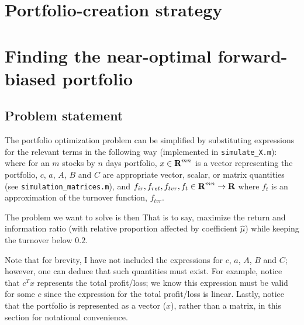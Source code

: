 \documentclass{article}
\begin{document}
 \clearpage


\section{Portfolio-creation strategy}


\section{Finding the near-optimal forward-biased portfolio}

\subsection{Problem statement}
    The portfolio optimization problem can be simplified 
        by substituting expressions for the relevant terms in the following way
        (implemented in \verb+simulate_X.m+):
    where for an $m$ stocks by $n$ days portfolio,
        \BI $x \in {\mbox{\bf R}}^{mn}$ is a vector representing the portfolio,
        \I  $c$, $a$, $A$, $B$ and $C$ are appropriate vector, scalar, 
            or matrix quantities (see \verb+simulation_matrices.m+), and
        \I  $f_{ir}, f_{ret}, f_{tvr}, f_{t} \in {\mbox{\bf R}}^{mn} \to {\mbox{\bf R}}$
            where $f_{t}$ is an approximation of the turnover function, 
            $f_{tvr}$. \EI

    The problem we want to solve is then
    That is to say, maximize the return and information ratio
        (with relative proportion affected by coefficient $\hat{\mu}$)
        while keeping the turnover below $0.2$.


    Note that for brevity, I have not included the expressions for 
        $c$, $a$, $A$, $B$ and $C$; 
        however, one can deduce that such quantities must exist.
    For example, notice that $c^T x$ represents the total profit/loss;
        we know this expression must be valid for some $c$ 
        since the expression for the total profit/loss is linear.
    Lastly, notice that the portfolio is represented as a vector ($x$),
        rather than a matrix, in this section for notational convenience.
\end{document}
